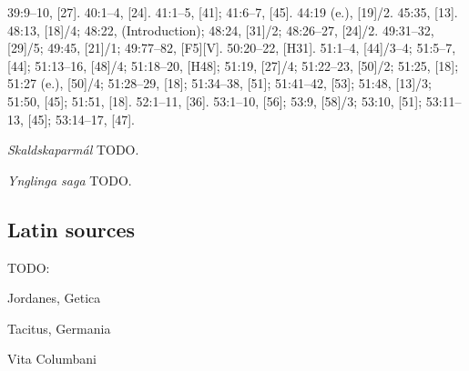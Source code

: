 \begin{itemize}
39:9--10, [27].
40:1--4, [24].
41:1--5, [41];
41:6--7, [45].
44:19 (e.), [19]/2.
45:35, [13].
48:13, [18]/4;
48:22,  (Introduction);
48:24, [31]/2;
48:26--27, [24]/2.
49:31--32, [29]/5;
49:45, [21]/1;
49:77--82, [F5][V].
50:20--22, [H31].
51:1--4, [44]/3--4;
51:5--7, [44];
51:13--16, [48]/4;
51:18--20, [H48];
51:19, [27]/4;
51:22--23, [50]/2;
51:25, [18];
51:27 (e.), [50]/4;
51:28--29, [18];
51:34--38, [51];
51:41--42, [53];
51:48, [13]/3;
51:50, [45];
51:51, [18].
52:1--11, [36].
53:1--10, [56];
53:9, [58]/3;
53:10, [51];
53:11--13, [45];
53:14--17, [47].

\emph{Skaldskaparmál} TODO.

\emph{Ynglinga saga} TODO.

\subsection{Latin sources}

TODO:

Jordanes, Getica

Tacitus, Germania

Vita Columbani

\end{itemize}
